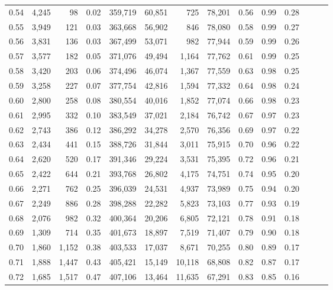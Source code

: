 \begin{tabular}{rrrrrrrrrrrrrr}
0.54 &  4,245 &     98 &  0.02 &  359,719 &   60,851 &     725 &  78,201 &  0.56 &  0.99 &      0.28 \\
0.55 &  3,949 &    121 &  0.03 &  363,668 &   56,902 &     846 &  78,080 &  0.58 &  0.99 &      0.27 \\
0.56 &  3,831 &    136 &  0.03 &  367,499 &   53,071 &     982 &  77,944 &  0.59 &  0.99 &      0.26 \\
0.57 &  3,577 &    182 &  0.05 &  371,076 &   49,494 &   1,164 &  77,762 &  0.61 &  0.99 &      0.25 \\
0.58 &  3,420 &    203 &  0.06 &  374,496 &   46,074 &   1,367 &  77,559 &  0.63 &  0.98 &      0.25 \\
0.59 &  3,258 &    227 &  0.07 &  377,754 &   42,816 &   1,594 &  77,332 &  0.64 &  0.98 &      0.24 \\
0.60 &  2,800 &    258 &  0.08 &  380,554 &   40,016 &   1,852 &  77,074 &  0.66 &  0.98 &      0.23 \\
0.61 &  2,995 &    332 &  0.10 &  383,549 &   37,021 &   2,184 &  76,742 &  0.67 &  0.97 &      0.23 \\
0.62 &  2,743 &    386 &  0.12 &  386,292 &   34,278 &   2,570 &  76,356 &  0.69 &  0.97 &      0.22 \\
0.63 &  2,434 &    441 &  0.15 &  388,726 &   31,844 &   3,011 &  75,915 &  0.70 &  0.96 &      0.22 \\
0.64 &  2,620 &    520 &  0.17 &  391,346 &   29,224 &   3,531 &  75,395 &  0.72 &  0.96 &      0.21 \\
0.65 &  2,422 &    644 &  0.21 &  393,768 &   26,802 &   4,175 &  74,751 &  0.74 &  0.95 &      0.20 \\
0.66 &  2,271 &    762 &  0.25 &  396,039 &   24,531 &   4,937 &  73,989 &  0.75 &  0.94 &      0.20 \\
0.67 &  2,249 &    886 &  0.28 &  398,288 &   22,282 &   5,823 &  73,103 &  0.77 &  0.93 &      0.19 \\
0.68 &  2,076 &    982 &  0.32 &  400,364 &   20,206 &   6,805 &  72,121 &  0.78 &  0.91 &      0.18 \\
0.69 &  1,309 &    714 &  0.35 &  401,673 &   18,897 &   7,519 &  71,407 &  0.79 &  0.90 &      0.18 \\
0.70 &  1,860 &  1,152 &  0.38 &  403,533 &   17,037 &   8,671 &  70,255 &  0.80 &  0.89 &      0.17 \\
0.71 &  1,888 &  1,447 &  0.43 &  405,421 &   15,149 &  10,118 &  68,808 &  0.82 &  0.87 &      0.17 \\
0.72 &  1,685 &  1,517 &  0.47 &  407,106 &   13,464 &  11,635 &  67,291 &  0.83 &  0.85 &      0.16 \\

\end{tabular}
